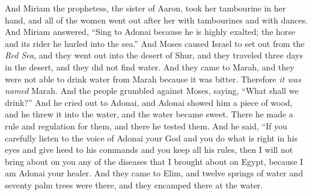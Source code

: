 \begin{biblechapter}
\verse And Miriam the prophetess, the sister of Aaron, took her tambourine in her hand, and all of the women went out after her with tambourines and with dances.
\verse And Miriam answered, “Sing to Adonai because he is highly exalted; the horse and its rider he hurled into the sea.”
 And Moses caused Israel to set out from the \textit{Red Sea}, and they went out into the desert of Shur, and they traveled three days in the desert, and they did not find water.
\verse And they came to Marah, and they were not able to drink water from Marah because it was bitter. Therefore \textit{it was named} Marah.
\verse And the people grumbled against Moses, saying, “What shall we drink?”
\verse And he cried out to Adonai, and Adonai showed him a piece of wood, and he threw it into the water, and the water became sweet. There he made a rule and regulation for them, and there he tested them.
\verse And he said, “If you carefully listen to the voice of Adonai your God and you do what is right in his eyes and give heed to his commands and you keep all his rules, then I will not bring about on you any of the diseases that I brought about on Egypt, because I am Adonai your healer.
\verse And they came to Elim, and twelve springs of water and seventy palm trees were there, and they encamped there at the water.
\end{biblechapter}

